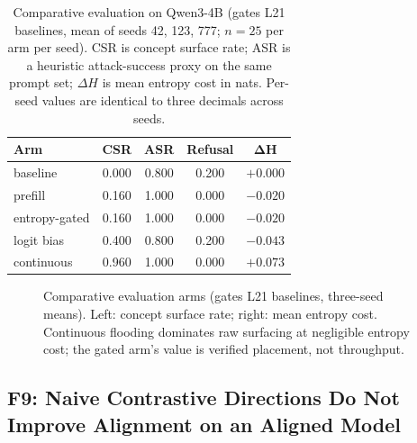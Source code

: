 \begin{table}[t]
\caption{Comparative evaluation on Qwen3-4B (gates L21 baselines, mean of seeds 42, 123, 777; $n=25$ per arm per seed). CSR is concept surface rate; ASR is a heuristic attack-success proxy on the same prompt set; $\Delta H$ is mean entropy cost in nats. Per-seed values are identical to three decimals across seeds.}
\label{tab:l21}
\vskip 0.1in
\centering
{\small
\begin{tabular}{lcccc}
\toprule
\textbf{Arm} & \textbf{CSR} & \textbf{ASR} & \textbf{Refusal} & $\bm{\Delta H}$ \\
\midrule
baseline       & 0.000 & 0.800 & 0.200 & $+0.000$ \\
prefill        & 0.160 & 1.000 & 0.000 & $-0.020$ \\
entropy-gated  & 0.160 & 1.000 & 0.000 & $-0.020$ \\
logit bias     & 0.400 & 0.800 & 0.200 & $-0.043$ \\
continuous     & 0.960 & 1.000 & 0.000 & $+0.073$ \\
\bottomrule
\end{tabular}}
\end{table}

\begin{figure}[t]
\centering
\resizebox{\columnwidth}{!}{}
\caption{Comparative evaluation arms (gates L21 baselines, three-seed means). Left: concept surface rate; right: mean entropy cost. Continuous flooding dominates raw surfacing at negligible entropy cost; the gated arm's value is verified placement, not throughput.}
\label{fig:l21}
\end{figure}

\subsection{F9: Naive Contrastive Directions Do Not Improve Alignment on an Aligned Model}
\label{sec:results:alignment}

